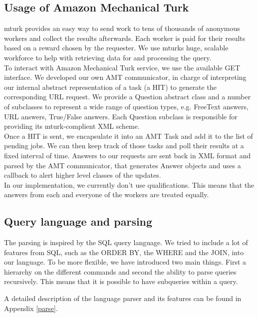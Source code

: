 \documentclass{article}
\begin{document}
\subsection{Usage of Amazon Mechanical Turk}
mturk provides an easy way to send work to tens of thousands of anonymous workers and collect the results afterwards. Each worker is paid for their results based on a reward chosen by the requester. We use mturks huge, scalable workforce to help with retrieving data for and processing the query. \\
To interact with Amazon Mechanical Turk service, we use the available GET interface. We developed our own AMT communicator, in charge of interpreting our internal abstract representation of a task (a HIT) to generate the corresponding URL request. We provide a Question abstract class and a number of subclasses to represent a wide range of question types, e.g. FreeText answers, URL answers, True/False answers. Each Question subclass is responsible for providing its mturk-complient XML scheme.\\
Once a HIT is sent, we encapsulate it into an AMT Task and add it to the list of pending jobs. We can then keep track of those tasks and poll their results at a fixed interval of time.
Answers to our requests are sent back in XML format and parsed by the AMT communicator, that generates Answer objects and uses a callback to alert higher level classes of the updates.\\
In our implementation, we currently don't use qualifications. This means that the answers from each and everyone of the workers are treated equally.
\subsection{Query language and parsing}
The parsing is inspired by the SQL query language. We tried to include a lot of features from SQL, such as the ORDER BY, the WHERE and the JOIN, into our language. To be more flexible, we have introduced two main things. First a hierarchy on the different commands and second the ability to parse queries recursively. This means that it is possible to have subqueries within a query.

A detailed description of the language parser and its features can be found in Appendix \ref{parse}.
\end{document}
